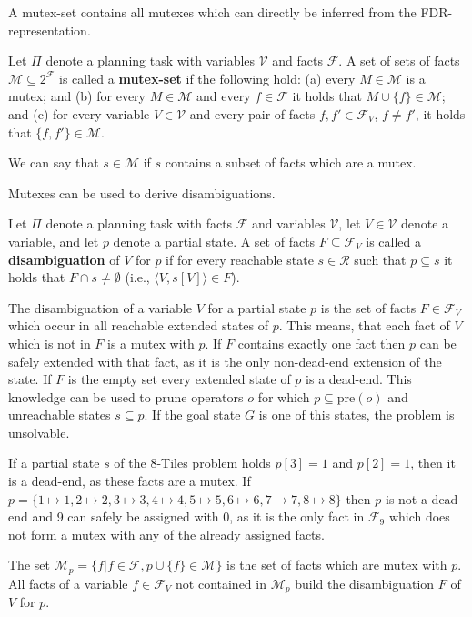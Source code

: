 A mutex-set contains all mutexes which can directly be inferred from the FDR-representation.
\begin{definition}
    Let $\Pi$ denote a planning task with variables $\mathcal{V}$ and facts $\mathcal{F}$.
    A set of sets of facts $\mathcal{M}\subseteq 2^{\mathcal{F}}$ is called a \textbf{mutex-set} if the following hold:
    (a) every $M\in\mathcal{M}$ is a mutex;
    and (b) for every $M\in\mathcal{M}$ and every $f\in\mathcal{F}$ it holds that $M\cup\{f\}\in\mathcal{M}$;
    and (c) for every variable $V\in\mathcal{V}$ and every pair of facts $f, f'\in\mathcal{F}_V$, $f\neq f'$, it holds
    that $\{f,f'\}\in\mathcal{M}$.
\end{definition}

We can say that $s\in\mathcal{M}$ if $s$ contains a subset of facts which are a mutex.

Mutexes can be used to derive disambiguations.
\begin{definition}
    Let $\Pi$ denote a planning task with facts $\mathcal{F}$ and variables $\mathcal{V}$, let $V\in\mathcal{V}$ denote
    a variable, and let $p$ denote a partial state.
    A set of facts $F\subseteq\mathcal{F}_V$ is called a \textbf{disambiguation} of $V$ for $p$ if for every reachable state
    $s\in\mathcal{R}$ such that $p\subseteq s$ it holds that $F\cap s\neq\emptyset$ (i.e., $\langle V,s[V]\rangle\in F$).
\end{definition}

The disambiguation of a variable $V$ for a partial state $p$ is the set of facts $F\in\mathcal{F}_V$ which occur in all reachable extended states of $p$.
This means, that each fact of $V$ which is not in $F$ is a mutex with $p$.
If $F$ contains exactly one fact then $p$ can be safely extended with that fact, as it is the only non-dead-end extension of the state.
If $F$ is the empty set every extended state of $p$ is a dead-end.
This knowledge can be used to prune operators $o$ for which $p\subseteq\text{pre}(o)$ and unreachable states $s\subseteq p$.
If the goal state $G$ is one of this states, the problem is unsolvable.

If a partial state $s$ of the 8-Tiles problem holds $p[3] = 1$ and $p[2] = 1$, then it is a dead-end, as these facts are a mutex.
If $p = \{1\mapsto1, 2\mapsto2, 3\mapsto3, 4\mapsto4, 5\mapsto5, 6\mapsto6, 7\mapsto7, 8\mapsto8\}$ then $p$ is not a dead-end and 9 can safely be assigned with $0$, as it is the only fact in $\mathcal{F}_9$ which does not form a mutex with any of the already assigned facts.

The set $\mathcal{M}_p=\{f|f\in\mathcal{F}, p\cup\{f\}\in\mathcal{M}\}$ is the set of facts which are mutex with $p$.
All facts of a variable $f\in\mathcal{F}_V$ not contained in $\mathcal{M}_p$ build the disambiguation $F$ of $V$ for $p$.


